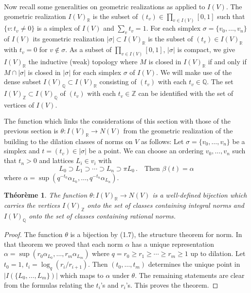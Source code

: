 \documentclass[12pt,a4paper]{article}
\theoremstyle{plain}
\newtheorem{theorem}{Th\'eor\`eme}[section]
\theoremstyle{definition}
\theoremstyle{remark}
\begin{document}
Now recall some generalities on geometric realizations as applied to $I(V)$. 
The geometric realization $I(V)_\mathbb{R}$ is the subset of 
$(t_v) \in \prod_{v \in I(V)} [0,1]$ such that $\{v : t_v \neq 0\}$ is a 
simplex of $I(V)$ and $\sum_v t_v = 1$. For each simplex 
$\sigma = \{v_0, \ldots, v_n\}$ of $I(V)$ its geometric realization 
$|\sigma| \subset I(V)_\mathbb{R}$ is the subset of $(t_v) \in I(V)_\mathbb{R}$ 
with $t_v = 0$ for $v \notin \sigma$. As a subset of 
$\prod_{v \in I(V)} [0,1]$, $|\sigma|$ is compact, we give $I(V)_\mathbb{R}$ 
the inductive (weak) topology where $M$ is closed in $I(V)_\mathbb{R}$ if and 
only if $M \cap |\sigma|$ is closed in $|\sigma|$ for each simplex $\sigma$ 
of $I(V)$. We will make use of the dense subset $I(V)_\mathbb{Q} \subset I(V)_\mathbb{R}$ 
consisting of $(t_v)$ with each $t_v \in \mathbb{Q}$. The set 
$I(V)_\mathbb{Z} \subset I(V)_\mathbb{Q}$ of $(t_v)$ with each $t_v \in \mathbb{Z}$ 
can be identified with the set of vertices of $I(V)$.

The function which links the considerations of this section with those of the 
previous section is $\theta\colon I(V)_\mathbb{R} \to N(V)$ from the geometric 
realization of the building to the dilation classes of norms on $V$ as 
follows: Let $\sigma = \{v_0, \ldots, v_n\}$ be a simplex and 
$t = (t_v) \in |\sigma|$ be a point. We can choose an ordering 
$v_0, \ldots, v_n$ such that $t_n > 0$ and lattices $L_i \in v_i$ with
\[
L_0 \supset L_1 \supset \cdots \supset L_n \supset \pi L_0 \,. \quad \text{Then } \beta(t) = \alpha
\]
where $\alpha = \sup(q^{-t_0}\alpha_{L_0}, \ldots, q^{-t_n}\alpha_{L_n})$.

\begin{theorem}
The function $\theta\colon I(V)_\mathbb{R} \to N(V)$ is a well-defined bijection 
which carries the vertices $I(V)_\mathbb{Z}$ onto the set of classes containing 
integral norms and $I(V)_\mathbb{Q}$ onto the set of classes containing rational 
norms.
\end{theorem}

\begin{proof}
The function $\theta$ is a bijection by (1.7), the structure theorem for 
norm. In that theorem we proved that each norm $\alpha$ has a unique 
representation $\alpha = \sup(r_0\alpha_{L_0}, \ldots, r_m\alpha_{L_m})$ where 
$q = r_0 \geqslant r_1 \geqslant \cdots \geqslant r_m \geqslant 1$ up to dilation. Let 
$t_0 = 1$, $t_i = \log_q(r_i/r_{i+1})$. Then $(t_0, \ldots, t_m)$ determines 
the unique point in $|I(\{L_0, \ldots, L_m\})|$ which maps to $\alpha$ under 
$\theta$. The remaining statements are clear from the formulas relating the 
$t_i$'s and $r_i$'s. This proves the theorem.
\end{proof}
\end{document}
